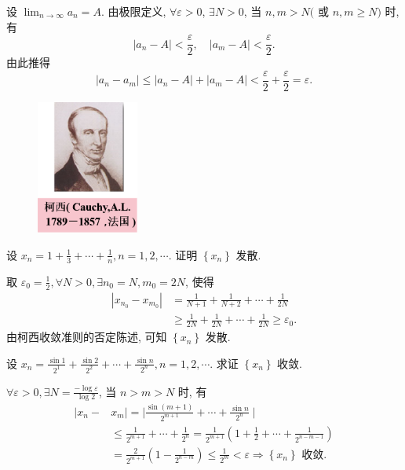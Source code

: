 \documentclass[t,12pt,mathserif] {beamer}
\begin{document}
\begin{frame}{}%
\zheng 设 $\lim _{n \rightarrow \infty} a_n=A$. 由极限定义, $\forall \varepsilon>0$, $\exists N>0$, 当 $n, m>N($ 或 $n, m \geq N)$ 时, 有
$$
\left|a_n-A\right|<\frac{\varepsilon}{2},\quad \left|a_m-A\right|<\frac{\varepsilon}{2} . 
$$
由此推得
$$
\left|a_n-a_m\right| \leq\left|a_n-A\right|+\left|a_m-A\right|<\frac{\varepsilon}{2}+\frac{\varepsilon}{2}=\varepsilon .
$$  
\begin{figure}
\vspace{-0.85\baselineskip}
\includegraphics[width=0.3\textwidth]{figures/cauchy.png}
\vspace{-0.85\baselineskip}
\end{figure}
\end{frame}

\begin{frame}{}%
\begin{ex}
    设 $x_n=1+\frac{1}{3}+\cdots+\frac{1}{n}, n=1,2, \cdots$. 证明 $\left\{x_n\right\}$ 发散.
\end{ex}
\zheng 取 $\varepsilon_0=\frac{1}{2}, \forall N>0, \exists n_0=N, m_0=2 N$, 使得
$$
\begin{aligned}
\left|x_{n_0}-x_{m_0}\right| & =\frac{1}{N+1}+\frac{1}{N+2}+\cdots+\frac{1}{2 N} \\
& \geq \frac{1}{2 N}+\frac{1}{2 N}+\cdots+\frac{1}{2 N} \geq \varepsilon_0 .
\end{aligned}
$$\vsp
由柯西收敛准则的否定陈述, 可知 $\left\{x_n\right\}$ 发散.    
\end{frame}

\begin{frame}{}%
\begin{ex}
  设 $x_n=\frac{\sin 1}{2^1}+\frac{\sin 2}{2^2}+\cdots+\frac{\sin n}{2^n}, n=1,2, \cdots$. 求证 $\left\{x_n\right\}$ 收敛.  
\end{ex}
\zheng $\forall \varepsilon>0, \exists N=\frac{-\log \varepsilon}{\log 2}$, 当 $n>m>N$ 时, 有
$$
\begin{aligned}
\mid x_n- & x_m|=| \frac{\sin (m+1)}{2^{m+1}}+\cdots+\frac{\sin n}{2^n} \mid \\
& \leq \frac{1}{2^{m+1}}+\cdots+\frac{1}{2^n}=\frac{1}{2^{m+1}}\left(1+\frac{1}{2}+\cdots+\frac{1}{2^{n-m-1}}\right) \\
& =\frac{2}{2^{m+1}}\left(1-\frac{1}{2^{n-m}}\right) \leq \frac{1}{2^m}<\varepsilon \Rightarrow\left\{x_n\right\} \text { 收敛. }
\end{aligned}
$$ 
\end{frame}
\end{document}
